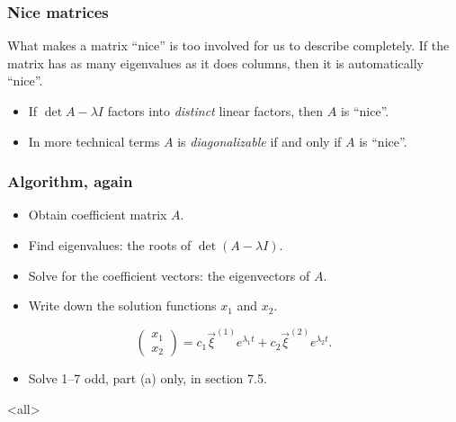 \begin{frame}

\frametitle{Nice matrices}
\label{nicematrices}

What makes a matrix ``nice'' is too involved for us to describe completely. If the matrix has as many eigenvalues as it does columns, then it is automatically ``nice''.

\begin{itemize}
\item If $ \det{A - \lambda I} $ factors into \emph{distinct} linear factors, then $ A $ is ``nice''.

\item In more technical terms $ A $ is \emph{diagonalizable} if and only if $ A $ is ``nice''.

\end{itemize}

\end{frame}

\begin{frame}

\frametitle{Algorithm, again}
\label{algorithmagain}

\begin{itemize}
\item Obtain coefficient matrix $ A $.

\item Find eigenvalues: the roots of $ \det(A - \lambda I) $.

\item Solve for the coefficient vectors: the eigenvectors of $ A $.

\item Write down the solution functions $ x_1 $ and $ x_2 $.

\end{itemize}

\[
    \begin{pmatrix} x_1 \\ x_2 \end{pmatrix} = c_1 \vec{\xi}^{(1)} e^{\lambda_1 t} + c_2 \vec{\xi}^{(2)} e^{\lambda_2 t}.
\]

\begin{itemize}
\item Solve 1--7 odd, part (a) only, in section 7.5.

\end{itemize}

\end{frame}

\mode<all>


\mode*

